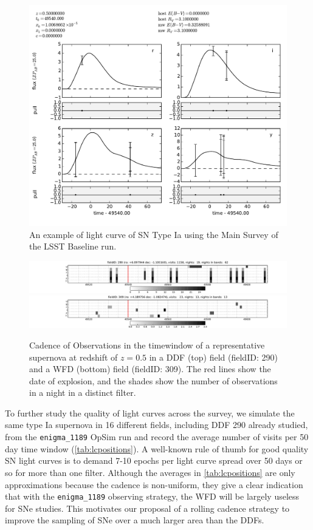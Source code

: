 \begin{figure}
\includegraphics[angle=0,width=0.99\hsize:,clip]{figs/SN_309_lc.pdf}
\caption{An example of light curve of SN Type Ia using the Main Survey
of the LSST Baseline \OpSim run.}
\label{fig:SNIaLCopsimmain}
\end{figure}

\begin{figure}
\includegraphics[angle=0,width=\textwidth,clip]{figs/SN_Cadence_290.pdf}
\includegraphics[angle=0,width=\textwidth,clip]{figs/SN_Cadence_309.pdf}
\caption{Cadence of Observations in the timewindow of a representative
supernova at redshift of $z=0.5$ in a DDF (top) field (fieldID: 290) and
a WFD (bottom) field (fieldID: 309). The red lines show the date of
explosion, and the shades show the number of observations in a night in
a distinct filter.}
\label{fig:perSNCadence}
\end{figure}

To further study the quality of light curves across the survey, we simulate the same type Ia 
supernova in 16 different fields, including DDF 290 already studied, from the \texttt{enigma\_1189} 
OpSim run and record the average number of visits per 50 day time window 
(\autoref{tab:lcpositions}). A well-known rule of thumb for good quality SN light curves is to 
demand 7-10 epochs per light curve spread over 50 days or so for more than one filter. Although 
the averages in \autoref{tab:lcpositions} are only approximations because the cadence is 
non-uniform, they give a clear indication that with the \texttt{enigma\_1189} observing strategy, 
the WFD will be largely useless for SNe studies. This motivates our proposal of a rolling cadence 
strategy to improve the sampling of SNe over a much larger area than the DDFs.


